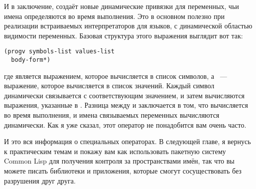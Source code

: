 И в заключение,  создаёт новые динамические привязки для переменных, чьи имена
определяются во время выполнения.  Это в основном полезно при реализации встраиваемых
интерпретаторов для языков, с динамической областью видимости переменных.  Базовая
структура этого выражения выглядит вот так:

\begin{lstlisting}
(progv symbols-list values-list
  body-form*)
\end{lstlisting}

где  является выражением, которое вычисляется в список символов, а
~--- выражение, которое вычисляется в список значений.  Каждый символ
динамически связывается с соответствующим значением, и затем вычисляются выражения,
указанные в .  Разница между  и  заключается в том,
что  вычисляется во время выполнения, и имена связываемых переменных
вычисляются динамически.  Как я уже сказал, этот оператор не понадобится вам очень часто.

И это вся информация о специальных операторах.  В следующей главе, я вернусь к
практическим темам и покажу вам как использовать пакетную систему Common Lisp для
получения контроля за пространствами имён, так что вы можете писать библиотеки и
приложения, которые смогут сосуществовать без разрушения друг друга.

